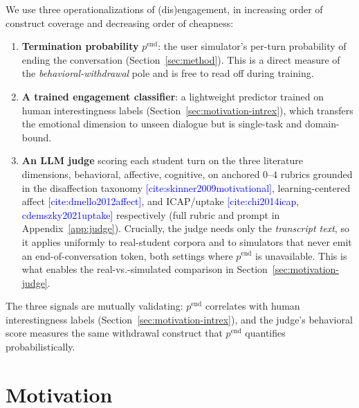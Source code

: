 \documentclass[11pt]{article}
\newcommand{\cit}[1]{\textcolor{blue}{[\textsf{cite:#1}]}}
\begin{document}
We use three operationalizations of (dis)engagement, in increasing order of construct coverage and decreasing order of cheapness:
\begin{enumerate}
  \item \textbf{Termination probability} $p^{\text{end}}$: the user simulator's per-turn probability of ending the conversation (Section~\ref{sec:method}). 
  This is a direct measure of the \emph{behavioral-withdrawal} pole and is free to read off during training.
  \item \textbf{A trained engagement classifier}: a lightweight predictor trained on human interestingness labels (Section~\ref{sec:motivation-intrex}), which transfers the emotional dimension to unseen dialogue but is single-task and domain-bound.
  \item \textbf{An LLM judge} scoring each student turn on the three literature dimensions, behavioral, affective, cognitive, on anchored $0$--$4$ rubrics grounded in the disaffection taxonomy \cit{skinner2009motivational}, learning-centered affect \cit{dmello2012affect}, and ICAP/uptake \cit{chi2014icap, cdemszky2021uptake} respectively 
  (full rubric and prompt in Appendix~\ref{app:judge}). Crucially, the judge needs only the \emph{transcript text}, so it applies uniformly to real-student corpora and to simulators that never emit an end-of-conversation token, both settings where $p^{\text{end}}$ is unavailable. 
  This is what enables the real-vs.-simulated comparison in Section~\ref{sec:motivation-judge}.
\end{enumerate}
The three signals are mutually validating: $p^{\text{end}}$ correlates with human interestingness labels (Section~\ref{sec:motivation-intrex}), and the
judge's behavioral score measures the same withdrawal construct that $p^{\text{end}}$ quantifies probabilistically.

\section{Motivation}
\label{sec:motivation}
\end{document}
